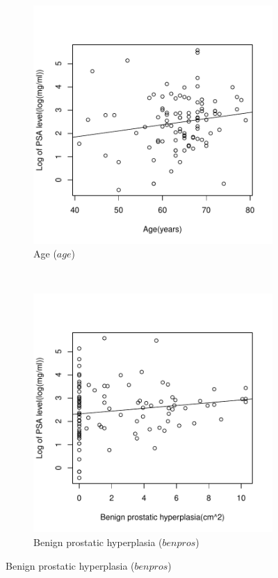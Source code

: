 \documentclass[12pt,letterpaper,titlepage,en-US]{article}
\begin{document}
\begin{figure}[H]
\begin{subfigure}[t]{0.5\textwidth}
    \end{subfigure}
    \\
    \begin{subfigure}[t]{0.5\textwidth}
        \centering
        \caption{Age ($age$)}
        \includegraphics[width=.96\textwidth]{fig/boxplotage.pdf}
    \end{subfigure}%
    ~
    \begin{subfigure}[t]{0.5\textwidth}
        \centering
        \caption{Benign prostatic hyperplasia ($benpros$)}
        \includegraphics[width=.96\textwidth]{fig/boxplotbenpros.pdf}

\end{subfigure}
\end{figure}
\end{document}
